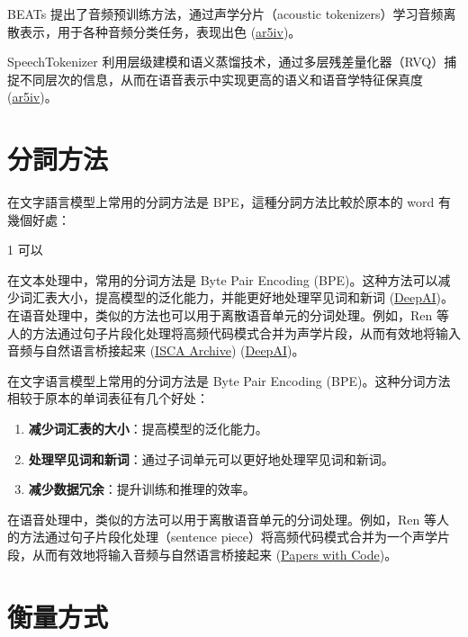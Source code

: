 BEATs 提出了音频预训练方法，通过声学分片（acoustic tokenizers）学习音频离散表示，用于各种音频分类任务，表现出色 (\href{https://ar5iv.org/abs/2212.09058}{ar5iv})。

SpeechTokenizer 利用层级建模和语义蒸馏技术，通过多层残差量化器（RVQ）捕捉不同层次的信息，从而在语音表示中实现更高的语义和语音学特征保真度 (\href{https://ar5iv.org/pdf/2308.16692}{ar5iv})。





\section{分詞方法}


在文字語言模型上常用的分詞方法是 BPE，這種分詞方法比較於原本的 word 有幾個好處：

1 可以


 在文本处理中，常用的分词方法是 Byte Pair Encoding (BPE)。这种方法可以减少词汇表大小，提高模型的泛化能力，并能更好地处理罕见词和新词 (\href{https://deepai.org/publication/speech-pre-training-with-acoustic-piece}{DeepAI})。在语音处理中，类似的方法也可以用于离散语音单元的分词处理。例如，Ren 等人的方法通过句子片段化处理将高频代码模式合并为声学片段，从而有效地将输入音频与自然语言桥接起来 (\href{https://www.isca-archive.org/interspeech_2022/ren22_interspeech.html}{ISCA Archive}) (\href{https://deepai.org/publication/speech-pre-training-with-acoustic-piece}{DeepAI})。 




在文字语言模型上常用的分词方法是 Byte Pair Encoding (BPE)。这种分词方法相较于原本的单词表征有几个好处：

\begin{enumerate}
    \item \textbf{减少词汇表的大小}：提高模型的泛化能力。
    \item \textbf{处理罕见词和新词}：通过子词单元可以更好地处理罕见词和新词。
    \item \textbf{减少数据冗余}：提升训练和推理的效率。
\end{enumerate}
在语音处理中，类似的方法可以用于离散语音单元的分词处理。例如，Ren 等人的方法通过句子片段化处理（sentence piece）将高频代码模式合并为一个声学片段，从而有效地将输入音频与自然语言桥接起来 (\href{https://paperswithcode.com/paper/speech-pre-training-with-acoustic-piece}{Papers with Code})。

 


 

\section{衡量方式}

